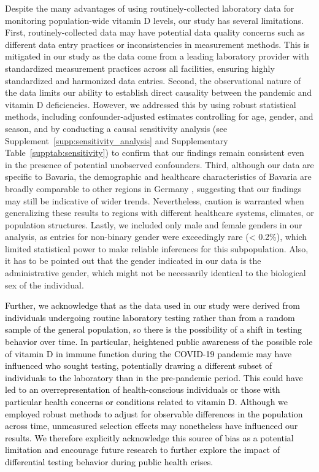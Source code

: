 \documentclass[12pt]{article}
\newcommand{\REV}[1]{\textcolor{black}{#1}}
\begin{document}
Despite the many advantages of using routinely-collected laboratory data for monitoring population-wide vitamin D levels, our study has several limitations. First, routinely-collected data may have potential data quality concerns such as different data entry practices or inconsistencies in measurement methods. This is mitigated in our study as the data come from a leading laboratory provider with standardized measurement practices across all facilities, ensuring highly standardized and harmonized data entries. Second, the observational nature of the data limits our ability to establish direct causality between the pandemic and vitamin D deficiencies. However, we addressed this by using robust statistical methods, including confounder-adjusted estimates controlling for age, gender, and season, and by conducting a causal sensitivity analysis (see Supplement~\ref{supp:sensitivity_analysis} and Supplementary Table~\ref{supptab:sensitivity}) to confirm that our findings remain consistent even in the presence of potential unobserved confounders. Third, although our data are specific to Bavaria, the demographic and healthcare characteristics of Bavaria are broadly comparable to other regions in Germany \cite{destatis_population_2024}, suggesting that our findings may still be indicative of wider trends. Nevertheless, caution is warranted when generalizing these results to regions with different healthcare systems, climates, or population structures. Lastly, we included only male and female genders in our analysis, as entries for non-binary gender were exceedingly rare (< 0.2\%), which limited statistical power to make reliable inferences for this subpopulation. Also, it has to be pointed out that the gender indicated in our data is the administrative gender, which might not be necessarily identical to the biological sex of the individual. 

\REV{Further, we acknowledge that as the data used in our study were derived from individuals undergoing routine laboratory testing rather than from a random sample of the general population, so there is the possibility of a shift in testing behavior over time. In particular, heightened public awareness of the possible role of vitamin D in immune function during the COVID-19 pandemic may have influenced who sought testing, potentially drawing a different subset of individuals to the laboratory than in the pre-pandemic period. This could have led to an overrepresentation of health-conscious individuals or those with particular health concerns or conditions related to vitamin D. Although we employed robust methods to adjust for observable differences in the population across time, unmeasured selection effects may nonetheless have influenced our results. We therefore explicitly acknowledge this source of bias as a potential limitation and encourage future research to further explore the impact of differential testing behavior during public health crises.}
\end{document}
